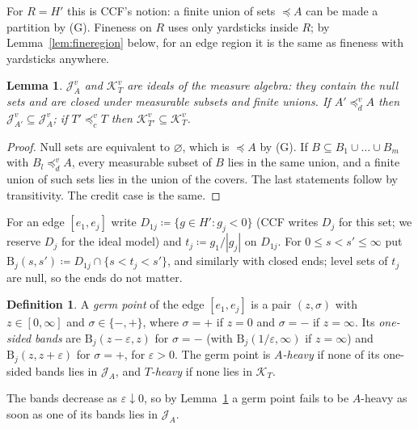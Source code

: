 \documentclass[11pt]{article}
\newtheorem{lemma}[theorem]{Lemma}
\theoremstyle{definition}\newtheorem{definition}[theorem]{Definition}
\theoremstyle{remark}\newtheorem{remark}[theorem]{Remark}
\newcommand{\Band}{\mathrm{B}}
\newcommand{\Jid}{\mathcal J}
\newcommand{\Kid}{\mathcal K}
\begin{document}
For $R=H'$ this is CCF's notion: a finite union of sets $\preceq A$ can be
made a partition by (G). Fineness on $R$ uses only yardsticks inside $R$; by
Lemma~\ref{lem:fineregion} below, for an edge region it is the same as
fineness with yardsticks anywhere.

\begin{lemma}\label{lem:ideal}
$\Jid^v_A$ and $\Kid^v_T$ are ideals of the measure algebra: they contain
the null sets and are closed under measurable subsets and finite unions. If
$A'\preceq^v_dA$ then $\Jid^v_{A'}\subseteq\Jid^v_A$; if
$T'\preceq^v_cT$ then $\Kid^v_{T'}\subseteq\Kid^v_T$.
\end{lemma}
\begin{proof}
Null sets are equivalent to $\varnothing$, which is $\preceq A$ by (G). If
$B\subseteq B_1\cup\dots\cup B_m$ with $B_l\preceq^v_dA$, every measurable
subset of $B$ lies in the same union, and a finite union of such sets lies
in the union of the covers. The last statements follow by transitivity. The
credit case is the same.
\end{proof}

For an edge $[e_1,e_j]$ write $D_{1j}\coloneqq\{g\in H':g_j<0\}$ (CCF writes
$D_j$ for this set; we reserve $D_j$ for the ideal model) and
$t_j\coloneqq g_1/|g_j|$ on $D_{1j}$. For $0\le s<s'\le\infty$ put
$\Band_j(s,s')\coloneqq D_{1j}\cap\{s<t_j<s'\}$, and similarly with closed
ends; level sets of $t_j$ are null, so the ends do not matter.

\begin{definition}\label{def:germ}
A \emph{germ point} of the edge $[e_1,e_j]$ is a pair $(z,\sigma)$ with
$z\in[0,\infty]$ and $\sigma\in\{-,+\}$, where $\sigma=+$ if $z=0$ and
$\sigma=-$ if $z=\infty$. Its \emph{one-sided bands} are
$\Band_j(z-\varepsilon,z)$ for $\sigma=-$ (with $\Band_j(1/\varepsilon,\infty)$
if $z=\infty$) and $\Band_j(z,z+\varepsilon)$ for $\sigma=+$, for
$\varepsilon>0$. The germ point is \emph{$A$-heavy} if none of its one-sided
bands lies in $\Jid_A$, and \emph{$T$-heavy} if none lies in $\Kid_T$.
\end{definition}

The bands decrease as $\varepsilon\downarrow0$, so by Lemma~\ref{lem:ideal}
a germ point fails to be $A$-heavy as soon as one of its bands lies in
$\Jid_A$.
\end{document}
